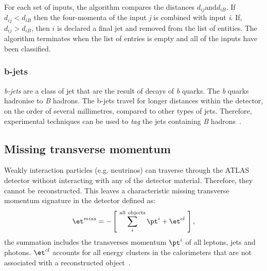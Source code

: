 For each set of inputs, the algorithm compares the distances $d_{ij} \mathrm{and} d_{iB}$. If $d_{ij} < d_{iB}$ then the four-momenta of the input \emph{j} is combined with input \emph{i}. If, $d_{ij} > d_{iB}$, then $i$ is declared a final jet and removed from the list of entities. The algorithm terminates when the list of entries is empty and all of the inputs have been classified. 

\subsubsection{b-jets}
\emph{b-jets} are a class of jet that are the result of decays of \emph{b} quarks. The \emph{b} quarks hadronise to \emph{B} hadrons. The b-jets travel for longer distances within the detector, on the order of several millimetres, compared to other types of jets. Therefore, experimental techniques can be used to \emph{tag} the jets containing \emph{B} hadrons~\cite{ATLAS:PHYS-PUB-2015-022,ATLAS:PHYS-PUB-2016-012}.

\subsection{Missing transverse momentum}
Weakly interaction particles (e.g. neutrinos) can traverse through the ATLAS detector without interacting with any of the detector material. Therefore, they cannot be reconstructed. This leaves a characteristic missing transverse momentum signature in the detector defined as: 
\begin{equation}
   \et^{miss} = - \left[ ~\sum^{\mathrm{all ~objects}}_i \pt^i + \et^{cl}~ \right],
\end{equation}
the summation includes the transverses momentum $\pt^i$ of all leptons, jets and photons. $\et^{cl}$ accounts for all energy clusters in the calorimeters that are not associated with a reconstructed object~\cite{ATL-PHYS-PUB-2015-027}.

\clearpage